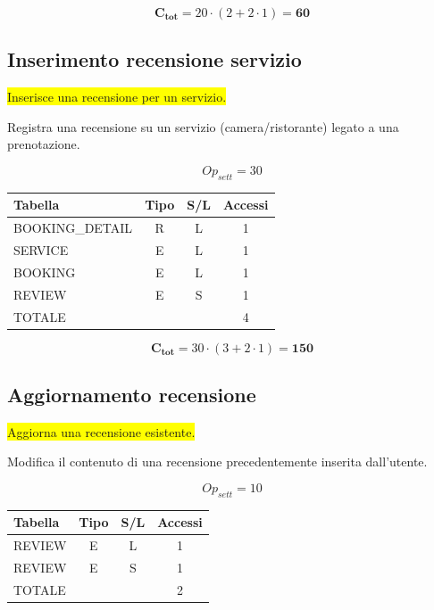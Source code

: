 \documentclass[a4paper,12pt]{report}
\begin{document}
$$\mathbf{C_{tot}} = 20 \cdot (2 + 2 \cdot 1) = \mathbf{60}$$

\subsection*{Inserimento recensione servizio} \label{op10}
\colorbox{yellow}{Inserisce una recensione per un servizio.}

Registra una recensione su un servizio (camera/ristorante) legato a
una prenotazione.

$$Op_{sett} = 30$$

\begin{table}[H]
  \centering
  \small
  \renewcommand{\arraystretch}{1.15}
  \begin{tabularx}{0.7\textwidth}{|X|c|c|c|}
    \hline
    \rowcolor{gray!20}
    \textbf{Tabella} & \textbf{Tipo} & \textbf{S/L} & \textbf{Accessi} \\
    \hline
    BOOKING\_DETAIL & R & L & 1\\
    SERVICE & E & L & 1 \\
    BOOKING & E & L & 1 \\
    REVIEW & E & S & 1 \\
    \hline
    \rowcolor{gray!20}
    TOTALE & & & 4 \\
    \hline
  \end{tabularx}
  \vspace{-1em}
\end{table}

$$\mathbf{C_{tot}} = 30 \cdot (3 + 2 \cdot 1) = \mathbf{150}$$

\subsection*{Aggiornamento recensione} \label{op11}
\colorbox{yellow}{Aggiorna una recensione esistente.}

Modifica il contenuto di una recensione precedentemente inserita dall'utente.

$$Op_{sett} = 10$$

\begin{table}[H]
  \centering
  \small
  \renewcommand{\arraystretch}{1.15}
  \begin{tabularx}{0.7\textwidth}{|X|c|c|c|}
    \hline
    \rowcolor{gray!20}
    \textbf{Tabella} & \textbf{Tipo} & \textbf{S/L} & \textbf{Accessi} \\
    \hline
    REVIEW & E & L & 1 \\
    REVIEW & E & S & 1 \\
    \hline
    \rowcolor{gray!20}
    TOTALE & & & 2 \\
    \hline
  \end{tabularx}
  \vspace{-1em}
\end{table}
\end{document}
